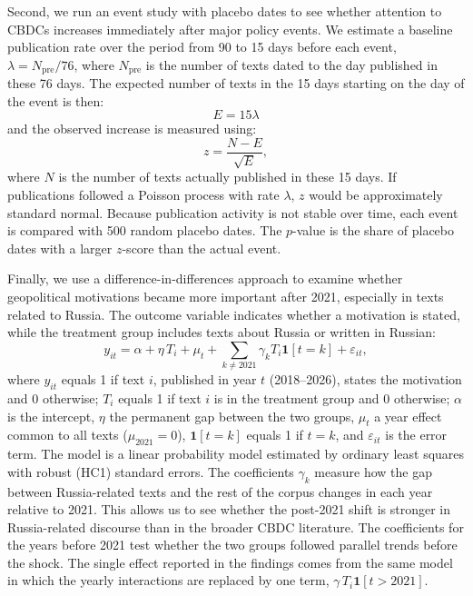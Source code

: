 \documentclass[11pt,a4paper]{article}
\begin{document}
Second, we run an event study with placebo dates to see whether attention to CBDCs increases immediately after major policy events. 
We estimate a baseline publication rate over the period from 90 to 15 days before each event, 
\(\lambda = N_{\text{pre}}/76\), where \(N_{\text{pre}}\) is the number of texts dated to the day published in these 76 days. The expected number of texts in 
the 15 days starting on the day of the event is then:
\begin{equation}\label{eq:expected}
E = 15\lambda
\end{equation}
and the observed increase is measured using:
\begin{equation}\label{eq:zevent}
z = \frac{N-E}{\sqrt{E}},
\end{equation}
where \(N\) is the number of texts actually published in these 15 days. If publications followed a Poisson process with rate \(\lambda\), 
\(z\) would be approximately standard normal.
Because publication activity is not stable over time, each event is compared with 500 random placebo dates. 
The \(p\)-value is the share of placebo dates with a larger \(z\)-score than the actual event.

Finally, we use a difference-in-differences approach to examine whether geopolitical motivations became more important after 2021, 
especially in texts related to Russia. The outcome variable indicates whether a motivation is stated, while the treatment group 
includes texts about Russia or written in Russian:
\begin{equation}\label{eq:did}
y_{it}
=
\alpha + \eta\, T_i + \mu_t
+
\sum_{k \neq 2021}
\gamma_k T_i \mathbf{1}[t = k]
+
\varepsilon_{it},
\end{equation}
where \(y_{it}\) equals 1 if text \(i\), published in year \(t\) (2018--2026), states the motivation and 0 otherwise; \(T_i\) equals 1 
if text \(i\) is in the treatment group and 0 otherwise; \(\alpha\) is the intercept, \(\eta\) the permanent gap between the two groups, 
\(\mu_t\) a year effect common to all texts (\(\mu_{2021} = 0\)), \(\mathbf{1}[t = k]\) equals 1 if \(t = k\), and \(\varepsilon_{it}\) is the error term. 
The model is a linear probability model estimated by ordinary least squares with robust (HC1) standard errors. 
The coefficients \(\gamma_k\) measure how the gap between Russia-related texts and the rest of the corpus changes in each year relative to 2021. 
This allows us to see whether the post-2021 shift is stronger in Russia-related discourse than in the broader CBDC literature. 
The coefficients for the years before 2021 test whether the two groups followed parallel trends before the shock. The single effect 
reported in the findings comes from the same model in which the yearly interactions are replaced by one term, 
\(\gamma\, T_i \mathbf{1}[t > 2021]\).
\end{document}
